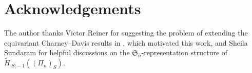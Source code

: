 \documentclass[reqno]{amsart}
\theoremstyle{definition}
\theoremstyle{remark}
\begin{document}
\section*{Acknowledgements}
The author thanks Victor Reiner for suggesting the problem of extending the equivariant Charney--Davis results in \cite{Liao2023Two}, which motivated this work, and Sheila Sundaram for helpful discussions on the $\mathfrak{S}_n$-representation structure of $\tilde{H}_{|S|-1}((\Pi_n)_S)$.





\end{document}
